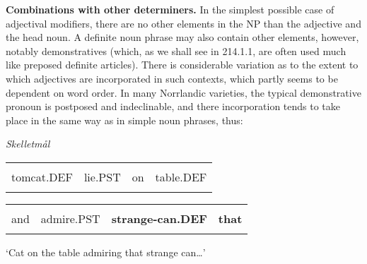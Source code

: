 \begin{styleBodytextC}
\textbf{Combinations with other determiners. }In the simplest possible case of adjectival modifiers, there are no other elements in the NP than the adjective and the head noun. A definite noun phrase may also contain other elements, however, notably demonstratives (which, as we shall see in 214.1.1, are often used much like preposed definite articles). There is considerable variation as to the extent to which adjectives are incorporated in such contexts, which partly seems to be dependent on word order. In many Norrlandic varieties, the typical demonstrative pronoun is postposed and indeclinable, and there incorporation tends to take place in the same way as in simple noun phrases, thus:

\end{styleBodytextC}

\begin{listWWNumileveli}
\item 

\begin{styleExample}\itshape
Skelletmål

\end{styleExample}

\end{listWWNumileveli}

\begin{tabular}{llll}
\lsptoprule
\multicolumn{4}{l}{Kattkalln

}\\
tomcat.DEF & lie.PST & on & table.DEF\\
\lspbottomrule
\end{tabular}

\begin{tabular}{llll}
\lsptoprule
\multicolumn{4}{l}{å

}\\
and & admire.PST & {\bfseries strange-can.DEF} & {\bfseries that}\\
\lspbottomrule
\end{tabular}

\begin{styleTranslation}
‘Cat on the table admiring that strange can…’

\end{styleTranslation}

